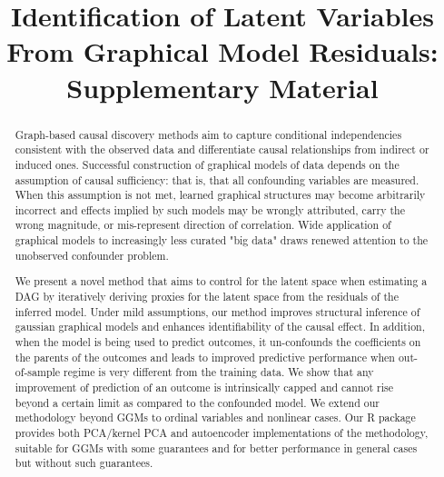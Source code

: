 \documentclass{article}
\title{Identification of Latent Variables From Graphical Model Residuals: Supplementary Material}
\begin{document}
\maketitle

\begin{abstract}
Graph-based causal discovery methods aim to capture conditional independencies consistent with the observed data and differentiate causal relationships from indirect or induced ones.  Successful construction of graphical models of data depends on the assumption of causal sufficiency: that is, that all confounding variables are measured. When this assumption is not met, learned graphical structures may become arbitrarily incorrect and effects implied by such models may be wrongly attributed, carry the wrong magnitude, or mis-represent direction of correlation.  Wide application of graphical models to increasingly less curated "big data" draws renewed attention to the unobserved confounder problem.  

We present a novel method that aims to control for the latent space when estimating a DAG by iteratively deriving proxies for the latent space from the residuals of the inferred model.  Under mild assumptions, our method improves structural inference of gaussian graphical models and enhances identifiability of the causal effect. In addition, when the model is being used to predict outcomes, it un-confounds the coefficients on the parents of the outcomes and leads to improved predictive performance when out-of-sample regime is very different from the training data.  We show that any improvement of prediction of an outcome is intrinsically capped and cannot rise beyond a certain limit as compared to the confounded model.  We extend our methodology beyond GGMs to ordinal variables and nonlinear cases.  Our R package provides both PCA/kernel PCA and autoencoder implementations of the methodology, suitable for GGMs with some guarantees and for better performance in general cases but without such guarantees. 
\end{abstract}
\end{document}
